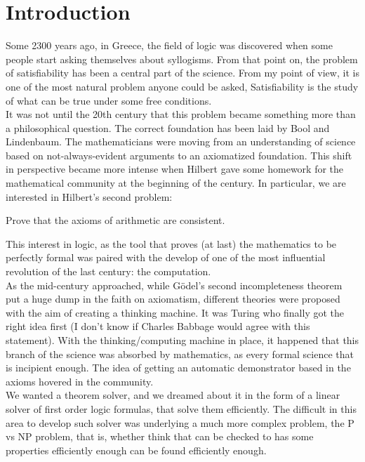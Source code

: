 
\chapter{Introduction}
Some 2300 years ago, in Greece,  the field of logic was discovered when some people start asking themselves about syllogisms. From that point on, the problem of satisfiability has been a central part of the science.  From my point of view, it is one of the most natural problem anyone could be asked,  Satisfiability is the study of what can be true under some free conditions.\\

It was not until the 20th century that this problem became something more than a philosophical question. The correct foundation has been laid by Bool and Lindenbaum. The mathematicians were moving from an understanding of science based on not-always-evident arguments to an axiomatized foundation. This shift in perspective became more intense when Hilbert gave some homework for the mathematical community at the beginning of the century. In particular, we are interested in Hilbert's second problem:


\begin{quoting}
Prove that the axioms of arithmetic are consistent. 
\end{quoting}

This interest in logic, as the tool that proves (at last) the mathematics to be perfectly formal was paired with the develop of one of the most influential revolution of the last century: the computation.\\

As the mid-century approached, while Gödel's second incompleteness theorem put a huge dump in the faith on axiomatism,  different theories were proposed with the aim of creating a thinking machine. It was Turing who finally got the right idea first (I don't know if Charles Babbage would agree with this statement). With the thinking/computing machine in place, it happened that this branch of the science was absorbed by mathematics, as every formal science that is incipient enough.  The idea of getting an automatic demonstrator based in the axioms hovered in the community.\\


We wanted a theorem solver, and we dreamed about it in the form of a linear solver of first order logic formulas, that solve them efficiently. The difficult in this area to develop such solver was underlying a much more complex problem, the P vs NP problem, that is, whether think that can be checked to has some properties efficiently enough can be found efficiently enough.\\

